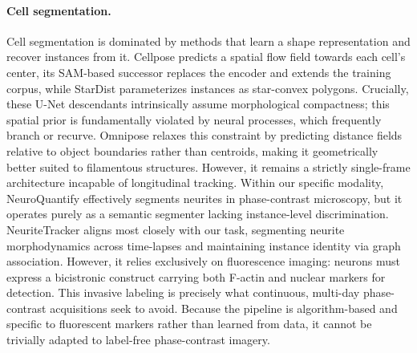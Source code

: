 \documentclass[11pt,a4paper]{article}
\begin{document}
\paragraph{Cell segmentation.} Cell segmentation is dominated by methods
that learn a shape representation and recover instances from it. Cellpose
\cite{stringer2021cellpose} predicts a spatial flow field towards each
cell's center, its SAM-based successor \cite{pachitariu2025cellposesam}
replaces the encoder and extends the training corpus, while StarDist
\cite{schmidt2018stardist} parameterizes instances as star-convex polygons.
Crucially, these U-Net \cite{ronneberger2015unet} descendants intrinsically
assume morphological compactness; this spatial prior is fundamentally
violated by neural processes, which frequently branch or recurve. Omnipose
\cite{cutler2022omnipose} relaxes this constraint by predicting distance
fields relative to object boundaries rather than centroids, making it
geometrically better suited to filamentous structures. However, it remains a
strictly single-frame architecture incapable of longitudinal tracking.
Within our specific modality, NeuroQuantify \cite{dang2024neuroquantify}
effectively segments neurites in phase-contrast microscopy, but it operates
purely as a semantic segmenter lacking instance-level discrimination.
NeuriteTracker \cite{fusco2016neuritetracker} aligns most closely with our
task, segmenting neurite morphodynamics across time-lapses and maintaining
instance identity via graph association. However, it relies exclusively on
fluorescence imaging: neurons must express a bicistronic construct carrying
both F-actin and nuclear markers for detection. This invasive labeling is
precisely what continuous, multi-day phase-contrast acquisitions seek to
avoid. Because the pipeline is algorithm-based and specific to fluorescent
markers rather than learned from data, it cannot be trivially adapted to
label-free phase-contrast imagery.
\end{document}
